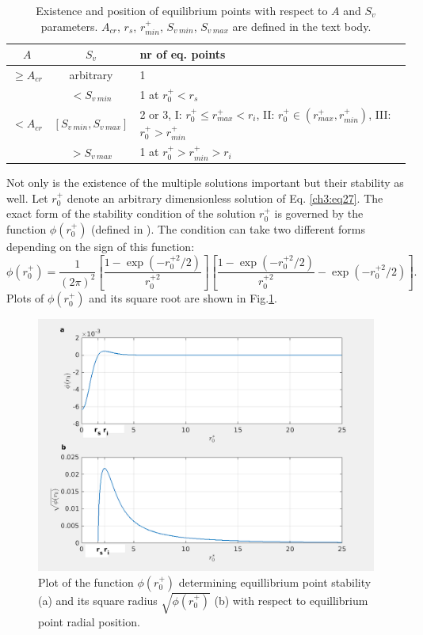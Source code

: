 \documentclass[../main.tex]{subfiles}
\begin{document}
\begin{table}
\small
\tabcolsep=0.2cm
\caption{Existence and position of equilibrium points with respect to $A$ and $S_v$ parameters. $A_{cr}$, $r_s$, $r^+_{min}$, $S_{v\ min}$, $S_{v\ max}$ are defined in the text body.}
\centering
\begin{tabular}{|c|c|l|}
\hline
$A$ & $S_v$ & nr  of eq. points\\
\hline
$\geq A_{cr}$ & arbitrary & 1 \\
\hline
\multirow{3}{*}{$<A_{cr}$} & $<S_{v\ min}$ & 1 at $r^+_0 <r_s$ \\
\multirow{3}{*}{\ } & $[S_{v\ min},S_{v\ max}]$  & 2 or 3, I: $r^+_0\leq r^+_{max}<r_i$, II: $r^+_0 \in (r^+_{max},r^+_{min})$, III: $r^+_0>r^+_{min}$\\
\multirow{3}{*}{\ } & $>S_{v\ max}$  & 1 at $r^+_0>r^+_{min}>r_i$\\
\hline
\end{tabular}
\label{tab:ch3_2b}
\end{table}

Not only is the existence of the multiple solutions important but their stability as well. Let $r^+_0$ denote an arbitrary dimensionless solution of Eq. \ref{ch3:eq27}. The exact form of the stability condition of the solution $r^+_0$ is governed by the function $\phi(r^+_0)$ (defined in \citet{Marcu1995}). The condition can take two different forms depending on the sign of this function:
\begin{equation}
\phi(r^+_0)=\frac{1}{(2 \pi)^2} \left[\frac{1-\exp(-r^{+ 2}_0/2)}{r^{+ 2}_0} \right] \left[\frac{1-\exp(-r^{+ 2}_0/2)}{r^{+ 2}_0}-\exp(-r^{+ 2}_0/2) \right].
\label{ch3:eq29}
\end{equation}
Plots of $\phi(r^+_0)$ and its square root are shown in Fig.\ref{fig:ch3_7}.

\begin{figure}
\centering
\noindent \includegraphics[width=30pc]{gfx/stability_functions.png}
\caption{Plot of the function $\phi(r^+_0)$ determining equillibrium point stability (a) and its square radius $\sqrt{\phi(r^+_0)}$ (b) with respect to equillibrium point radial position.}
\label{fig:ch3_7}
\end{figure}
\end{document}
